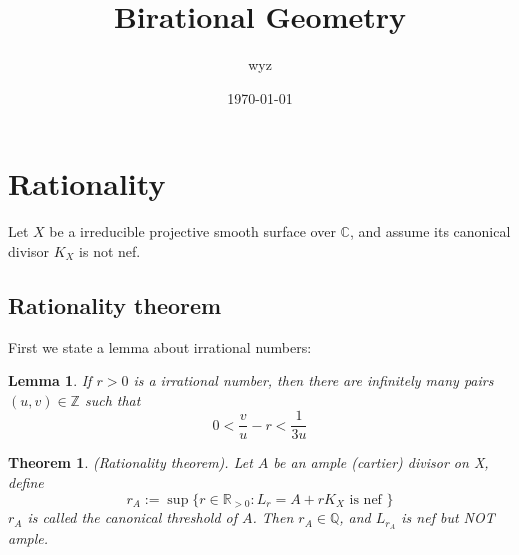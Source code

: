 \documentclass{article}
\title{Birational Geometry}
\author{wyz}
\date{\today}
\newtheorem{lem}[defn]{Lemma}
\newtheorem{thm}[defn]{Theorem}
\begin{document}
\maketitle
\section{Rationality}

Let $ X $ be a irreducible projective smooth surface over $ \mathbb{C} $, and assume its canonical divisor $ K_X $ is not nef.
\subsection{Rationality theorem}

First we state a lemma about irrational numbers:
\begin{lem}
  If $ r>0 $ is a irrational number, then there are infinitely many pairs $ (u,v)\in \mathbb{Z} $ such that
  \[ 0<\frac{v}{u}-r< \frac{1}{3u}\]
\end{lem}

\begin{thm}
  (Rationality theorem). Let $ A $ be an ample (cartier) divisor on X, define
  \[ r_A:=\sup \{ r\in \mathbb{R}_{>0}:L_r=A+rK_X \text{ is nef  } \} \]
  $ r_A $ is called  the canonical threshold of $ A $. Then $ r_A\in \mathbb{Q} $, and $ L_{r_A} $ is nef but NOT ample.
\end{thm}
\end{document}
